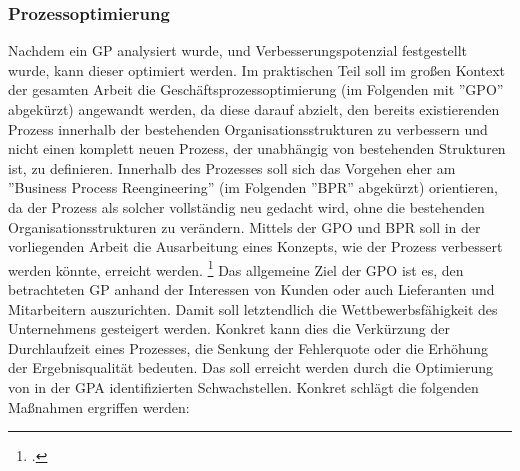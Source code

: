 


\subsubsection{Prozessoptimierung}

Nachdem ein GP analysiert wurde, und Verbesserungspotenzial festgestellt wurde, kann dieser optimiert werden. Im praktischen Teil soll im gro\ss en Kontext der gesamten Arbeit die Geschäftsprozessoptimierung (im Folgenden mit ''GPO'' abgekürzt) angewandt werden, da diese darauf abzielt, den bereits existierenden Prozess innerhalb der bestehenden Organisationsstrukturen zu verbessern und nicht einen komplett neuen Prozess, der unabhängig von bestehenden Strukturen ist, zu definieren. Innerhalb des Prozesses soll sich das Vorgehen eher am ''Business Process Reengineering'' (im Folgenden ''BPR'' abgekürzt) orientieren, da der Prozess als solcher vollständig neu gedacht wird, ohne die bestehenden Organisationsstrukturen zu verändern.  Mittels der GPO und BPR soll in der vorliegenden Arbeit die Ausarbeitung eines Konzepts, wie der Prozess verbessert werden könnte, erreicht werden. \footcite[Vgl.][S. 31]{theorie_gadatsch_grundkurs_geschäftsprozessmanagement_2010} Das allgemeine Ziel der GPO ist es, den betrachteten GP anhand der Interessen von Kunden oder auch Lieferanten und Mitarbeitern auszurichten. Damit soll letztendlich die Wettbewerbsfähigkeit des Unternehmens gesteigert werden. Konkret kann dies die Verkürzung der Durchlaufzeit eines Prozesses, die Senkung der Fehlerquote oder die Erhöhung der Ergebnisqualität bedeuten. Das soll erreicht werden durch die Optimierung von in der GPA identifizierten Schwachstellen. Konkret schlägt \cite[][]{theorie_bleicher_organisation_1991} die folgenden Ma\ss nahmen ergriffen werden:

